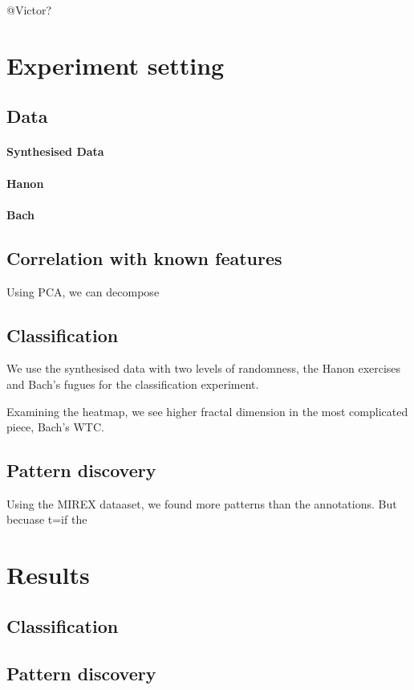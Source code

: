 \documentclass[acmsmall,review,anonymous]{acmart}\settopmatter{printfolios=true,printccs=false,printacmref=false}
\begin{document}
@Victor?

\section{Experiment setting}
\subsection{Data}
\paragraph{Synthesised Data}

\paragraph{Hanon}

\paragraph{Bach}

\subsection{Correlation with known features}
Using PCA, we can decompose 

\subsection{Classification}
We use the synthesised data with two levels of randomness, the Hanon exercises
and Bach's fugues for the classification experiment.

Examining the heatmap, we see higher fractal dimension in the most complicated
piece, Bach's WTC. 

\subsection{Pattern discovery}
Using the MIREX dataaset, we found more patterns than the annotations. But
becuase t=if the

\section{Results}

\subsection{Classification}
\subsection{Pattern discovery}
\end{document}
